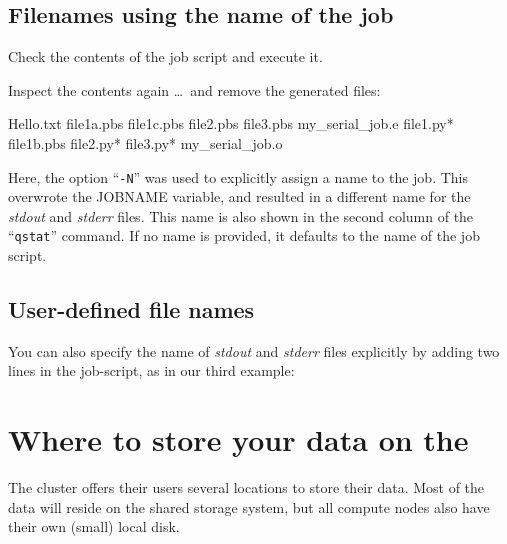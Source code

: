 \subsection{Filenames using the name of the job}

Check the contents of the job script and execute it.


\begin{prompt}
\end{prompt}

Inspect the contents again \dots\ and remove the generated files:

\begin{prompt}
Hello.txt  file1a.pbs  file1c.pbs  file2.pbs  file3.pbs  my_serial_job.e%
file1.py*  file1b.pbs  file2.py*   file3.py*  my_serial_job.o%
\end{prompt}

Here, the option ``\texttt{-N}'' was used to explicitly assign a name to the job.  This
overwrote the JOBNAME variable, and resulted in a different name for the
\emph{stdout} and \emph{stderr} files. This name is also shown in the
second column of the ``\texttt{qstat}'' command. If no name is provided, it defaults to
the name of the job script.

\subsection{User-defined file names}

You can also specify the name of \emph{stdout} and \emph{stderr} files
explicitly by adding two lines in the job-script, as in our third example:


\begin{prompt}
\end{prompt}

\section{Where to store your data on the \hpc}

The \hpc cluster offers their users several locations to store their data. Most
of the data will reside on the shared storage system, but all compute nodes
also have their own (small) local disk.

